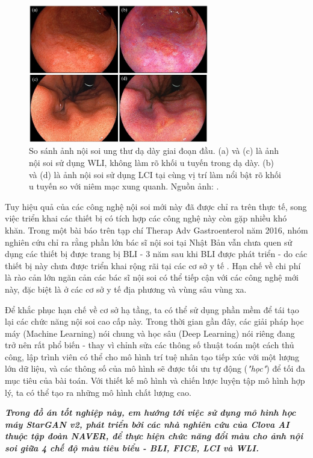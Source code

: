 \documentclass[12pt]{extreport}
\begin{document}
\begin{figure}[H]
    \centering
    \includegraphics[width=0.7\textwidth]{figure1}
    \caption{So sánh ảnh nội soi ung thư dạ dày giai đoạn đầu. (a) và (c) là ảnh nội soi sử dụng WLI, không làm rõ khối u tuyến trong dạ dày. (b) và (d) là ảnh nội soi sử dụng LCI tại cùng vị trí làm nổi bật rõ khối u tuyến so với niêm mạc xung quanh. Nguồn ảnh: \cite{pmid31700545}.}
    \label{wli-lci}
\end{figure}

Tuy hiệu quả của các công nghệ nội soi mới này đã được chỉ ra trên thực tế, song việc triển khai các thiết bị có tích hợp các công nghệ này còn gặp nhiều khó khăn. Trong một bài báo trên tạp chí Therap Adv Gastroenterol năm 2016, nhóm nghiên cứu chỉ ra rằng phần lớn bác sĩ nội soi tại Nhật Bản vẫn chưa quen sử dụng các thiết bị được trang bị BLI - 3 năm sau khi BLI được phát triển - do các thiết bị này chưa được triển khai rộng rãi tại các cơ sở y tế \cite{pmid26770267}. Hạn chế về chi phí là rào cản lớn ngăn cản các bác sĩ nội soi có thể tiếp cận với các công nghệ mới này, đặc biệt là ở các cơ sở y tế địa phương và vùng sâu vùng xa.

Để khắc phục hạn chế về cơ sở hạ tầng, ta có thể sử dụng phần mềm để tái tạo lại các chức năng nội soi cao cấp này. Trong thời gian gần đây, các giải pháp học máy (Machine Learning) nói chung và học sâu (Deep Learning) nói riêng đang trở nên rất phổ biến - thay vì chỉnh sửa các thông số thuật toán một cách thủ công, lập trình viên có thể cho mô hình trí tuệ nhân tạo tiếp xúc với một lượng lớn dữ liệu, và các thông số của mô hình sẽ được tối ưu tự động (\textit{"học"}) để tối đa mục tiêu của bài toán. Với thiết kế mô hình và chiến lược luyện tập mô hình hợp lý, ta có thể tạo ra những mô hình chất lượng cao.

\textit{\textbf{Trong đồ án tốt nghiệp này, em hướng tới việc sử dụng mô hình học máy StarGAN v2, phát triển bởi các nhà nghiên cứu của Clova AI thuộc tập đoàn NAVER, để thực hiện chức năng đổi màu cho ảnh nội soi giữa 4 chế độ màu tiêu biểu - BLI, FICE, LCI và WLI.}}
\end{document}
